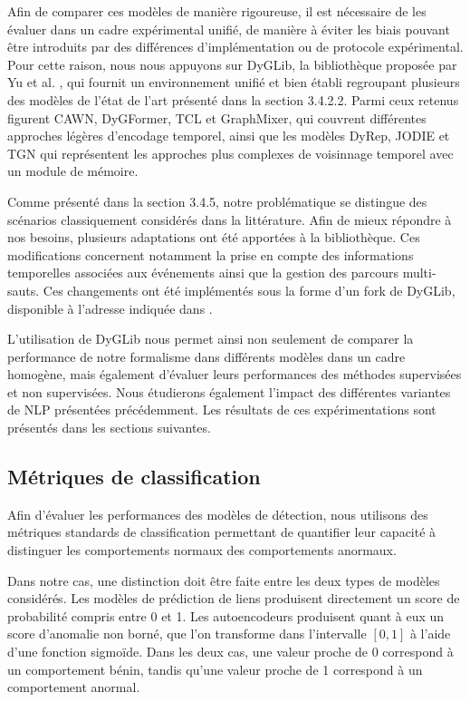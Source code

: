 \documentclass[a4paper,11pt,twoside]{StyleThese}
\begin{document}
Afin de comparer ces modèles de manière rigoureuse, il est nécessaire de les évaluer dans un cadre expérimental unifié, de manière à éviter les biais pouvant être introduits par des différences d'implémentation ou de protocole expérimental. Pour cette raison, nous nous appuyons sur DyGLib, la bibliothèque proposée par Yu et al. \cite{dygformer}, qui fournit un environnement unifié et bien établi regroupant plusieurs des modèles de l'état de l'art présenté dans la section 3.4.2.2. Parmi ceux retenus figurent CAWN, DyGFormer, TCL et GraphMixer, qui couvrent différentes approches légères d'encodage temporel, ainsi que les modèles DyRep, JODIE et TGN qui représentent les approches plus complexes de voisinnage temporel avec un module de mémoire.

Comme présenté dans la section 3.4.5, notre problématique se distingue des scénarios classiquement considérés dans la littérature. Afin de mieux répondre à nos besoins, plusieurs adaptations ont été apportées à la bibliothèque. Ces modifications concernent notamment la prise en compte des informations temporelles associées aux événements ainsi que la gestion des parcours multi-sauts. Ces changements ont été implémentés sous la forme d'un fork de DyGLib, disponible à l'adresse indiquée dans \cite{dyglib_fork}.

L'utilisation de DyGLib nous permet ainsi non seulement de comparer la performance de notre formalisme dans différents modèles dans un cadre homogène, mais également d'évaluer leurs performances des méthodes supervisées et non supervisées. Nous étudierons également l'impact des différentes variantes de NLP présentées précédemment. Les résultats de ces expérimentations sont présentés dans les sections suivantes. %

\subsection{Métriques de classification}
Afin d'évaluer les performances des modèles de détection, nous utilisons des métriques standards de classification permettant de quantifier leur capacité à distinguer les comportements normaux des comportements anormaux.

Dans notre cas, une distinction doit être faite entre les deux types de modèles considérés. Les modèles de prédiction de liens produisent directement un score de probabilité compris entre 0 et 1. Les autoencodeurs produisent quant à eux un score d’anomalie non borné, que l’on transforme dans l’intervalle $[0,1]$ à l’aide d’une fonction sigmoïde. Dans les deux cas, une valeur proche de 0 correspond à un comportement bénin, tandis qu’une valeur proche de 1 correspond à un comportement anormal.
\end{document}
